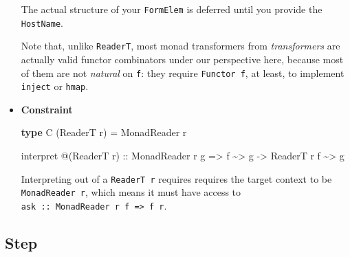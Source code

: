 \documentclass[]{article}
\newenvironment{Shaded}{}{}
\newcommand{\DataTypeTok}[1]{\textcolor[rgb]{0.56,0.13,0.00}{#1}}
\newcommand{\KeywordTok}[1]{\textcolor[rgb]{0.00,0.44,0.13}{\textbf{#1}}}
\newcommand{\NormalTok}[1]{#1}
\newcommand{\OperatorTok}[1]{\textcolor[rgb]{0.40,0.40,0.40}{#1}}
\newcommand{\OtherTok}[1]{\textcolor[rgb]{0.00,0.44,0.13}{#1}}
\begin{document}
\begin{itemize}
  The actual structure of your \texttt{FormElem} is deferred until you provide
  the \texttt{HostName}.

  Note that, unlike \texttt{ReaderT}, most monad transformers from
  \emph{transformers} are actually valid functor combinators under our
  perspective here, because most of them are not \emph{natural} on \texttt{f}:
  they require \texttt{Functor\ f}, at least, to implement \texttt{inject} or
  \texttt{hmap}.
\item
  \textbf{Constraint}

\begin{Shaded}
\begin{Highlighting}[]
\KeywordTok{type} \DataTypeTok{C}\NormalTok{ (}\DataTypeTok{ReaderT}\NormalTok{ r) }\OtherTok{=} \DataTypeTok{MonadReader}\NormalTok{ r}

\NormalTok{interpret }\OperatorTok{@}\NormalTok{(}\DataTypeTok{ReaderT}\NormalTok{ r)}
\OtherTok{    ::} \DataTypeTok{MonadReader}\NormalTok{ r g}
    \OtherTok{=>}\NormalTok{ f }\OperatorTok{\textasciitilde{}>}\NormalTok{ g}
    \OtherTok{{-}>} \DataTypeTok{ReaderT}\NormalTok{ r f }\OperatorTok{\textasciitilde{}>}\NormalTok{ g}
\end{Highlighting}
\end{Shaded}

  Interpreting out of a \texttt{ReaderT\ r} requires requires the target context
  to be \texttt{MonadReader\ r}, which means it must have access to
  \texttt{ask\ ::\ MonadReader\ r\ f\ =\textgreater{}\ f\ r}.
\end{itemize}

\hypertarget{step}{%
\subsection{Step}\label{step}}
\end{document}
